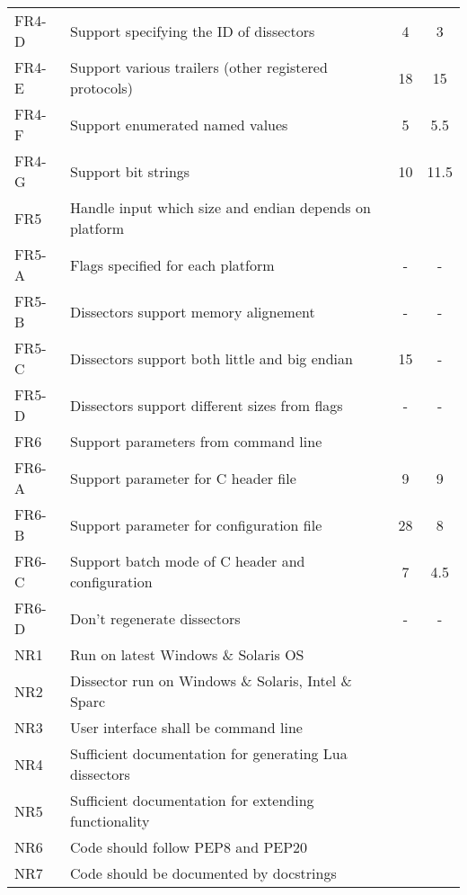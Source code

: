\begin{table}[ht]
\begin{tabularx}{\textwidth}{l X c c}
	FR4-D & Support specifying the ID of dissectors & 4 & 3 \\
	FR4-E & Support various trailers (other registered protocols) & 18 & 15 \\
	FR4-F & Support enumerated named values  & 5 & 5.5 \\
	FR4-G & Support bit strings & 10 & 11.5 \\
	\addlinespace
	FR5 & Handle input which size and endian depends on platform & & \\
	FR5-A & Flags specified for each platform & - & - \\
	FR5-B & Dissectors support memory alignement & - & - \\
	FR5-C & Dissectors support both little and big endian & 15 & - \\
	FR5-D & Dissectors support different sizes from flags & - & - \\	
	\addlinespace
	FR6 & Support parameters from command line & & \\
	FR6-A & Support parameter for C header file & 9 & 9 \\
	FR6-B & Support parameter for configuration file & 28 & 8 \\
	FR6-C & Support batch mode of C header and configuration & 7 & 4.5 \\
	FR6-D & Don't regenerate dissectors & - & - \\
	\addlinespace
	NR1 & Run on latest Windows \& Solaris OS & & \\
	NR2 & Dissector run on Windows \& Solaris, Intel \& Sparc & & \\
	NR3 & User interface shall be command line & & \\
	NR4 & Sufficient documentation for generating Lua dissectors & & \\
	NR5 & Sufficient documentation for extending functionality & & \\
	NR6 & Code should follow PEP8 and PEP20 & & \\
	NR7 & Code should be documented by docstrings & & \\
	\bottomrule
\end{tabularx}
\end{table}

